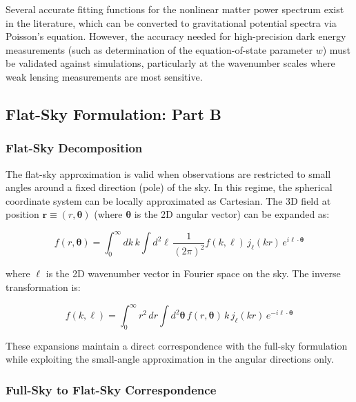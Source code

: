 Several accurate fitting functions for the nonlinear matter power spectrum exist in the literature, which can be converted to gravitational potential spectra via Poisson's equation. However, the accuracy needed for high-precision dark energy measurements (such as determination of the equation-of-state parameter $w$) must be validated against simulations, particularly at the wavenumber scales where weak lensing measurements are most sensitive.

\subsection{Flat-Sky Formulation: Part B}

\subsubsection{Flat-Sky Decomposition}

The flat-sky approximation is valid when observations are restricted to small angles around a fixed direction (pole) of the sky. In this regime, the spherical coordinate system can be locally approximated as Cartesian. The 3D field at position $\mathbf{r} \equiv (r, \boldsymbol{\theta})$ (where $\boldsymbol{\theta}$ is the 2D angular vector) can be expanded as:

\begin{equation}
f(r, \boldsymbol{\theta}) = \int_0^\infty dk \, k \int d^2\ell \, \frac{1}{(2\pi)^2} f(k, \boldsymbol{\ell}) \, j_\ell(kr) \, e^{i\boldsymbol{\ell} \cdot \boldsymbol{\theta}}
\label{eq:flat_sky_expansion_forward}
\end{equation}

where $\boldsymbol{\ell}$ is the 2D wavenumber vector in Fourier space on the sky. The inverse transformation is:

\begin{equation}
f(k, \boldsymbol{\ell}) = \int_0^\infty r^2 \, dr \int d^2\boldsymbol{\theta} \, f(r, \boldsymbol{\theta}) \, k \, j_\ell(kr) \, e^{-i\boldsymbol{\ell} \cdot \boldsymbol{\theta}}
\label{eq:flat_sky_expansion_inverse}
\end{equation}

These expansions maintain a direct correspondence with the full-sky formulation while exploiting the small-angle approximation in the angular directions only.

\subsubsection{Full-Sky to Flat-Sky Correspondence}

